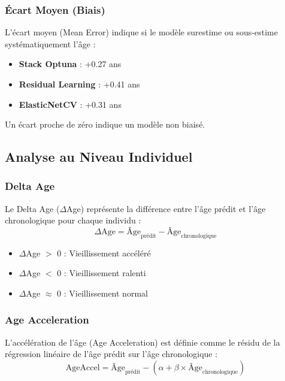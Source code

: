 \documentclass[11pt,a4paper]{article}
\begin{document}
\subsubsection{Écart Moyen (Biais)}

L'écart moyen (Mean Error) indique si le modèle surestime ou sous-estime systématiquement l'âge :

\begin{itemize}
    \item \textbf{Stack Optuna} : +0.27 ans
    \item \textbf{Residual Learning} : +0.41 ans
    \item \textbf{ElasticNetCV} : +0.31 ans
\end{itemize}

Un écart proche de zéro indique un modèle non biaisé.

\subsection{Analyse au Niveau Individuel}

\subsubsection{Delta Age}

Le Delta Age ($\Delta$Age) représente la différence entre l'âge prédit et l'âge chronologique 
pour chaque individu :
\begin{equation}
\Delta\text{Age} = \text{Âge}_{\text{prédit}} - \text{Âge}_{\text{chronologique}}
\end{equation}

\begin{itemize}
    \item $\Delta$Age $>$ 0 : Vieillissement accéléré
    \item $\Delta$Age $<$ 0 : Vieillissement ralenti
    \item $\Delta$Age $\approx$ 0 : Vieillissement normal
\end{itemize}

\subsubsection{Age Acceleration}

L'accélération de l'âge (Age Acceleration) est définie comme le résidu de la régression 
linéaire de l'âge prédit sur l'âge chronologique :
\begin{equation}
\text{AgeAccel} = \text{Âge}_{\text{prédit}} - (\alpha + \beta \times \text{Âge}_{\text{chronologique}})
\end{equation}
\end{document}
